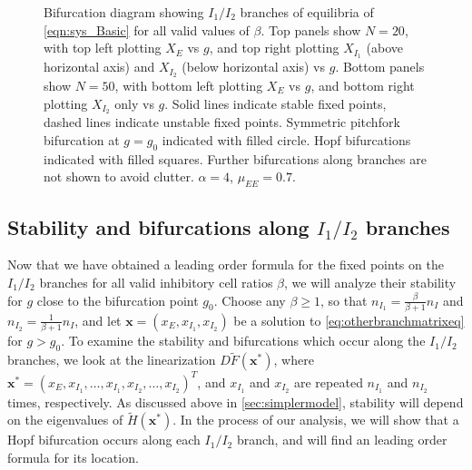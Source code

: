 \documentclass[reqno]{siamonline190516}
\newcommand{\xvec}{\mathbf{x}}
\begin{document}
\begin{figure}
\begin{tabular}{cc}
    \end{tabular}
    \caption{Bifurcation diagram showing $I_1/I_2$ branches of equilibria of \cref{eqn:sys_Basic} for all valid values of $\beta$. Top panels show $N=20$, with top left plotting $X_E$ vs $g$, and top right plotting $X_{I_1}$ (above horizontal axis) and $X_{I_2}$ (below horizontal axis) vs $g$. Bottom panels show $N=50$, with bottom left plotting $X_E$ vs $g$, and bottom right plotting $X_{I_2}$ only vs $g$. Solid lines indicate stable fixed points, dashed lines indicate unstable fixed points. Symmetric pitchfork bifurcation at $g = g_0$ indicated with filled circle. Hopf bifurcations indicated with filled squares. Further bifurcations along branches are not shown to avoid clutter. $\alpha = 4$, $\mu_{EE} = 0.7$.}
    \label{fig:noclusterBD1}
\end{figure}

\subsection{Stability and bifurcations along \texorpdfstring{$I_1/I_2$}{I1/I2} branches}

Now that we have obtained a leading order formula for the fixed points on the $I_1/I_2$ branches for all valid inhibitory cell ratios $\beta$, we will analyze their stability for $g$ close to the bifurcation point $g_0$. Choose any $\beta \geq 1$, so that $n_{I_1} = \frac{\beta}{\beta+1}n_I$ and $n_{I_2} = \frac{1}{\beta+1}n_I$, and let $\xvec = (x_E, x_{I_1}, x_{I_2})$ be a solution to \cref{eq:otherbranchmatrixeq} for $g > g_0$. To examine the stability and bifurcations which occur along the $I_1/I_2$ branches, we look at the linearization $D\tilde{F}(\xvec^*)$, where $\xvec^* = (x_E, x_{I_1}, \dots, x_{I_1}, x_{I_2}, \dots, x_{I_2})^T$, and $x_{I_1}$ and $x_{I_2}$ are repeated $n_{I_1}$ and $n_{I_2}$ times, respectively. As discussed above in \cref{sec:simplermodel}, stability will depend on the eigenvalues of $\tilde{H}(\xvec^*)$. In the process of our analysis, we will show that a Hopf bifurcation occurs along each $I_1/I_2$ branch, and will find an leading order formula for its location.
\end{document}
